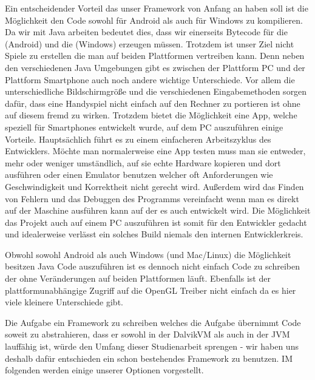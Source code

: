 Ein entscheidender Vorteil das unser Framework von Anfang an haben soll ist die Möglichkeit den Code sowohl für Android als auch für Windows zu kompilieren.
Da wir mit Java arbeiten bedeutet dies, dass wir einerseits Bytecode für die  (Android) und die  (Windows) erzeugen müssen.
Trotzdem ist unser Ziel nicht Spiele zu erstellen die man auf beiden Plattformen vertreiben kann.
Denn neben den verschiedenen Java Umgebungen gibt es zwischen der Plattform PC und der Plattform Smartphone auch noch andere wichtige Unterschiede.
Vor allem die unterschiedliche Bildschirmgröße und die verschiedenen Eingabemethoden sorgen dafür, dass eine Handyspiel nicht einfach auf den Rechner zu portieren ist ohne auf diesem fremd zu wirken.
Trotzdem bietet die Möglichkeit eine App, welche speziell für Smartphones entwickelt wurde, auf dem PC auszuführen einige Vorteile.
Hauptsächlich führt es zu einem einfacheren Arbeitszyklus des Entwicklers. Möchte man normalerweise eine App testen muss man sie entweder, mehr oder weniger umständlich, auf sie echte Hardware kopieren und dort ausführen oder einen Emulator benutzen welcher oft Anforderungen wie Geschwindigkeit und Korrektheit nicht gerecht wird. Außerdem wird das Finden von Fehlern und das Debuggen des Programms vereinfacht wenn man es direkt auf der Maschine ausführen kann auf der es auch entwickelt wird.
Die Möglichkeit das Projekt auch auf einem PC auszuführen ist somit für den Entwickler gedacht und idealerweise verlässt ein solches Build niemals den internen Entwicklerkreis.

Obwohl sowohl Android als auch Windows (und Mac/Linux) die Möglichkeit besitzen Java Code auszuführen ist es dennoch nicht einfach Code zu schreiben der ohne Veränderungen auf beiden Plattformen läuft. Ebenfalls ist der plattformunabhängige Zugriff auf die OpenGL Treiber nicht einfach da es hier viele kleinere Unterschiede gibt.

Die Aufgabe ein Framework zu schreiben welches die Aufgabe übernimmt Code soweit zu abstrahieren, dass er sowohl in der DalvikVM als auch in der JVM lauffähig ist, würde den Umfang dieser Studienarbeit sprengen - wir haben uns deshalb dafür entschieden ein schon bestehendes Framework zu benutzen. IM folgenden werden einige unserer Optionen vorgestellt.